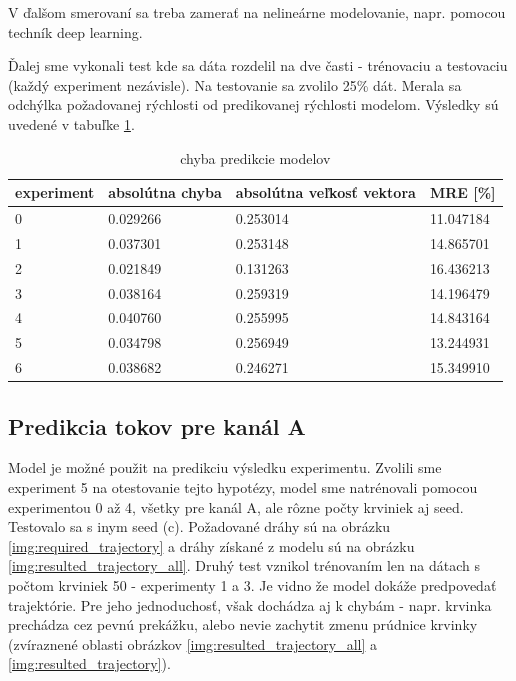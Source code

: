 \documentclass[10pt,a4paper]{article}
\begin{document}
V ďalšom smerovaní sa treba zamerať na nelineárne modelovanie, napr. pomocou techník deep learning.

Ďalej sme vykonali test kde sa dáta rozdelil na dve časti - trénovaciu a testovaciu (každý experiment nezávisle).
Na testovanie sa zvolilo 25\% dát. Merala sa odchýlka požadovanej rýchlosti od predikovanej rýchlosti modelom.
Výsledky sú uvedené v tabuľke \ref{tab:model_prediction_errors}.



\begin{table}[]
\centering
\caption{chyba predikcie modelov}
\label{tab:model_prediction_errors}
\begin{tabular}{|l|l|l|l|}
\hline
experiment & absolútna chyba & absolútna veľkosť vektora & MRE {[}\%{]} \\ \hline
0          & 0.029266        & 0.253014                  & 11.047184    \\ \hline
1          & 0.037301        & 0.253148                  & 14.865701    \\ \hline
2          & 0.021849        & 0.131263                  & 16.436213    \\ \hline
3          & 0.038164        & 0.259319                  & 14.196479    \\ \hline
4          & 0.040760        & 0.255995                  & 14.843164    \\ \hline
5          & 0.034798        & 0.256949                  & 13.244931    \\ \hline
6          & 0.038682        & 0.246271                  & 15.349910    \\ \hline
\end{tabular}
\end{table}

\subsection{Predikcia tokov pre kanál A}

Model je možné použit na predikciu výsledku experimentu. Zvolili sme experiment 5 na otestovanie tejto hypotézy,
model sme natrénovali pomocou experimentou 0 až 4, všetky pre kanál A, ale rôzne počty krviniek aj seed. Testovalo
sa s inym seed (c). Požadované dráhy sú na obrázku \ref{img:required_trajectory} a dráhy získané z modelu sú na obrázku
\ref{img:resulted_trajectory_all}. Druhý test vznikol trénovaním len na dátach s počtom krviniek 50 - experimenty 1 a 3. Je vidno že model dokáže predpovedať trajektórie. Pre jeho jednoduchosť, však dochádza
aj k chybám - napr. krvinka prechádza cez pevnú prekážku,
alebo nevie zachytit zmenu prúdnice krvinky  (zvíraznené oblasti obrázkov \ref{img:resulted_trajectory_all} a \ref{img:resulted_trajectory}).
\end{document}
